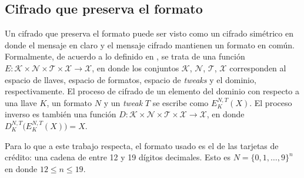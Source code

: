 \subsection{Cifrado que preserva el formato}



Un cifrado que preserva el formato puede ser visto como un cifrado simétrico en
donde el mensaje en claro y el mensaje cifrado mantienen un formato en común.
Formalmente, de acuerdo a lo definido en \cite{DBLP:conf/sacrypt/BellareRRS09},
se trata de una función $ E: \mathcal{K} \times \mathcal{N} \times \mathcal{T}
\times \mathcal{X} \rightarrow \mathcal{X} $, en donde los conjuntos $
\mathcal{K} $, $ \mathcal{N} $, $ \mathcal{T} $, $ \mathcal{X} $ corresponden al
espacio de llaves, espacio de formatos, espacio de \textit{tweaks} y el dominio,
respectivamente. El proceso de cifrado de un elemento del dominio con respecto a
una llave $ K $, un formato $ N $ y un \textit{tweak} $ T $ se escribe como  $
E_K^{N,T}(X) $. El proceso inverso es también una función $ D: \mathcal{K}
\times \mathcal{N} \times \mathcal{T} \times \mathcal{X} \rightarrow
\mathcal{X} $, en donde $ D_K^{N,T}\big( E_K^{N,T}(X) \big) = X $.


Para lo que a este trabajo respecta, el formato usado es el de las tarjetas de
crédito: una cadena de entre 12 y 19 dígitos decimales. Esto es $ N = \{0, 1,
\dots, 9\}^n $ en donde $ 12 \leq n \leq 19 $.

